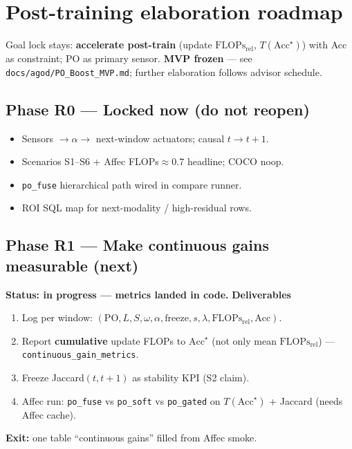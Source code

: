 \documentclass[11pt]{article}
\newcommand{\PO}{\mathrm{PO}}
\newcommand{\Flops}{\mathrm{FLOPs}_{\mathrm{rel}}}
\newcommand{\Acc}{\mathrm{Acc}}
\begin{document}
\section{Post-training elaboration roadmap}
\label{sec:road}

Goal lock stays: \textbf{accelerate post-train} (update $\Flops$,
$T(\Acc^\star)$) with Acc as constraint; PO as primary sensor.
\textbf{MVP frozen} --- see \texttt{docs/agod/PO\_Boost\_MVP.md};
further elaboration follows advisor schedule.

\subsection{Phase R0 --- Locked now (do not reopen)}
\begin{itemize}[leftmargin=1.2em,itemsep=1pt]
  \item Sensors $\to\alpha\to$ next-window actuators; causal $t\to t{+}1$.
  \item Scenarios S1--S6 + Affec FLOPs$\approx0.7$ headline; COCO noop.
  \item \texttt{po\_fuse} hierarchical path wired in compare runner.
  \item ROI SQL map for next-modality / high-residual rows.
\end{itemize}

\subsection{Phase R1 --- Make continuous gains measurable (next)}
\textbf{Status: in progress --- metrics landed in code.}
\textbf{Deliverables}
\begin{enumerate}[leftmargin=1.2em,itemsep=1pt]
  \item Log per window:
        $(\PO,L,S,\omega,\alpha,\mathrm{freeze},s,\lambda,\Flops,\Acc)$.
  \item Report \textbf{cumulative} update FLOPs to $\Acc^\star$
        (not only mean $\Flops$) --- \texttt{continuous\_gain\_metrics}.
  \item Freeze Jaccard$(t,t{+}1)$ as stability KPI (S2 claim).
  \item Affec run: \texttt{po\_fuse} vs \texttt{po\_soft} vs
        \texttt{po\_gated} on $T(\Acc^\star)$ + Jaccard
        (needs Affec cache).
\end{enumerate}
\textbf{Exit:} one table ``continuous gains'' filled from Affec smoke.
\end{document}
